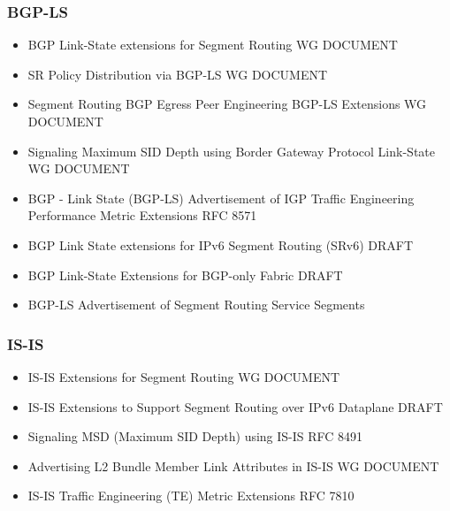 {\subsubsection{BGP-LS}
\begin{itemize}
    \item BGP Link-State extensions for Segment Routing WG DOCUMENT \cite{ietf-idr-bgp-ls-segment-routing-ext}
    \item SR Policy Distribution via BGP-LS WG DOCUMENT \cite{ietf-idr-te-lsp-distribution}
    \item Segment Routing BGP Egress Peer Engineering BGP-LS Extensions WG DOCUMENT \cite{ietf-idr-bgpls-segment-routing-epe}
    \item Signaling Maximum SID Depth using Border Gateway Protocol Link-State WG DOCUMENT \cite{ietf-idr-bgp-ls-segment-routing-msd}
    \item BGP - Link State (BGP-LS) Advertisement of IGP Traffic Engineering Performance Metric Extensions RFC 8571 \cite{rfc8571}
    \item BGP Link State extensions for IPv6 Segment Routing (SRv6) DRAFT \cite{ietf-idr-bgpls-srv6-ext}
    \item BGP Link-State Extensions for BGP-only Fabric DRAFT \cite{ketant-idr-bgp-ls-bgp-only-fabric}
    \item BGP-LS Advertisement of Segment Routing Service Segments \cite{dawra-idr-bgp-ls-sr-service-segments}
\end{itemize}    
\subsubsection{IS-IS}
\begin{itemize}
    \item IS-IS Extensions for Segment Routing WG DOCUMENT \cite{ietf-isis-segment-routing-extensions}
    \item IS-IS Extensions to Support Segment Routing over IPv6 Dataplane DRAFT \cite{id-isis-srv6-extensions}
    \item Signaling MSD (Maximum SID Depth) using IS-IS RFC 8491 \cite{rfc8491}
    \item Advertising L2 Bundle Member Link Attributes in IS-IS WG DOCUMENT \cite{ietf-isis-l2bundles}
    \item IS-IS Traffic Engineering (TE) Metric Extensions RFC 7810 \cite{rfc7810}
\end{itemize}    
}
